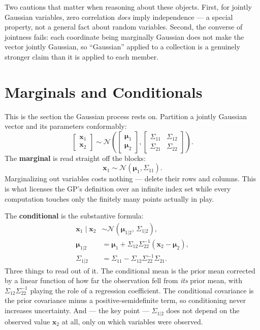 \documentclass[conference]{IEEEtran}
\begin{document}
Two cautions that matter when reasoning about these objects. First, for jointly Gaussian variables, zero correlation \textit{does} imply independence --- a special property, not a general fact about random variables. Second, the converse of jointness fails: each coordinate being marginally Gaussian does not make the vector jointly Gaussian, so ``Gaussian'' applied to a collection is a genuinely stronger claim than it is applied to each member.

\section*{Marginals and Conditionals}
This is the section the Gaussian process rests on. Partition a jointly Gaussian vector and its parameters conformably:
\begin{equation}
    \begin{bmatrix}\mathbf{x}_1\\\mathbf{x}_2\end{bmatrix}
    \sim
    \mathcal{N}\!\left(
    \begin{bmatrix}\boldsymbol{\mu}_1\\\boldsymbol{\mu}_2\end{bmatrix},
    \begin{bmatrix}\Sigma_{11} & \Sigma_{12}\\ \Sigma_{21} & \Sigma_{22}\end{bmatrix}
    \right).
\end{equation}
The \textbf{marginal} is read straight off the blocks:
\begin{equation}
    \mathbf{x}_1 \sim \mathcal{N}(\boldsymbol{\mu}_1, \Sigma_{11}).
\end{equation}
Marginalizing out variables costs nothing --- delete their rows and columns. This is what licenses the GP's definition over an infinite index set while every computation touches only the finitely many points actually in play.

The \textbf{conditional} is the substantive formula:
\begin{align}
    \mathbf{x}_1 \mid \mathbf{x}_2 &\sim \mathcal{N}\!\left(\boldsymbol{\mu}_{1|2},\, \Sigma_{1|2}\right), \\
    \boldsymbol{\mu}_{1|2} &= \boldsymbol{\mu}_1 + \Sigma_{12}\Sigma_{22}^{-1}(\mathbf{x}_2 - \boldsymbol{\mu}_2), \\
    \Sigma_{1|2} &= \Sigma_{11} - \Sigma_{12}\Sigma_{22}^{-1}\Sigma_{21}.
\end{align}
Three things to read out of it. The conditional mean is the prior mean corrected by a linear function of how far the observation fell from \textit{its} prior mean, with $\Sigma_{12}\Sigma_{22}^{-1}$ playing the role of a regression coefficient. The conditional covariance is the prior covariance minus a positive-semidefinite term, so conditioning never increases uncertainty. And --- the key point --- $\Sigma_{1|2}$ does not depend on the observed value $\mathbf{x}_2$ at all, only on which variables were observed.
\end{document}
